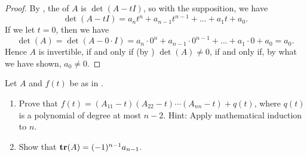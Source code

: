 \begin{proof}
By , the \CPOLY{} of \(A\) is \(\det(A - tI)\), so with the supposition, we have
\[
    \det(A - tI) = a_n t^n + a_{n - 1}t^{n - 1} + ... + a_1 t + a_0.
\]
If we let \(t = 0\), then we have
\[
    \det(A) = \det(A - 0 \cdot I)= a_n \cdot 0^n + a_{n - 1} \cdot 0^{n - 1} + ... + a_1 \cdot 0 + a_0 = a_0.
\]
Hence \(A\) is invertible, if and only if (by ) \(\det(A) \ne 0\), if and only if, by what we have shown, \(a_0 \ne 0\).
\end{proof}

\begin{exercise} \label{exercise 5.1.21}
Let \(A\) and \(f(t)\) be as in .
\begin{enumerate}
\item Prove that \(f(t) = (A_{11} - t)(A_{22} - t) \cdots (A_{nn} - t) + q(t)\),
where \(q(t)\) is a polynomial of degree at most \(n - 2\).
Hint: Apply mathematical induction to \(n\).
\item Show that \(\textbf{tr}(A) = (-1)^{n - 1} a_{n - 1}\).
\end{enumerate}
\end{exercise}

